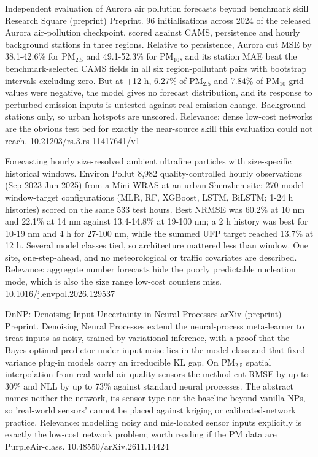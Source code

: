 \documentclass[10pt]{article}
\begin{document}
{Independent evaluation of Aurora air pollution forecasts beyond benchmark skill}
{Research Square (preprint)}
{Preprint. 96 initialisations across 2024 of the released Aurora air-pollution checkpoint, scored against CAMS, persistence and hourly background stations in three regions. Relative to persistence, Aurora cut MSE by 38.1-42.6\% for PM$_{2.5}$ and 49.1-52.3\% for PM$_{10}$, and its station MAE beat the benchmark-selected CAMS fields in all six region-pollutant pairs with bootstrap intervals excluding zero. But at +12 h, 6.27\% of PM$_{2.5}$ and 7.84\% of PM$_{10}$ grid values were negative, the model gives no forecast distribution, and its response to perturbed emission inputs is untested against real emission change. Background stations only, so urban hotspots are unscored. Relevance: dense low-cost networks are the obvious test bed for exactly the near-source skill this evaluation could not reach.}
{10.21203/rs.3.rs-11417641/v1}

{Forecasting hourly size-resolved ambient ultrafine particles with size-specific historical windows.}
{Environ Pollut}
{8,982 quality-controlled hourly observations (Sep 2023-Jun 2025) from a Mini-WRAS at an urban Shenzhen site; 270 model-window-target configurations (MLR, RF, XGBoost, LSTM, BiLSTM; 1-24 h histories) scored on the same 533 test hours. Best NRMSE was 60.2\% at 10 nm and 22.1\% at 14 nm against 13.4-14.8\% at 19-100 nm; a 2 h history was best for 10-19 nm and 4 h for 27-100 nm, while the summed UFP target reached 13.7\% at 12 h. Several model classes tied, so architecture mattered less than window. One site, one-step-ahead, and no meteorological or traffic covariates are described. Relevance: aggregate number forecasts hide the poorly predictable nucleation mode, which is also the size range low-cost counters miss.}
{10.1016/j.envpol.2026.129537}

{DnNP: Denoising Input Uncertainty in Neural Processes}
{arXiv (preprint)}
{Preprint. Denoising Neural Processes extend the neural-process meta-learner to treat inputs as noisy, trained by variational inference, with a proof that the Bayes-optimal predictor under input noise lies in the model class and that fixed-variance plug-in models carry an irreducible KL gap. On PM$_{2.5}$ spatial interpolation from real-world air-quality sensors the method cut RMSE by up to 30\% and NLL by up to 73\% against standard neural processes. The abstract names neither the network, its sensor type nor the baseline beyond vanilla NPs, so 'real-world sensors' cannot be placed against kriging or calibrated-network practice. Relevance: modelling noisy and mis-located sensor inputs explicitly is exactly the low-cost network problem; worth reading if the PM data are PurpleAir-class.}
{10.48550/arXiv.2611.14424}
\end{document}
